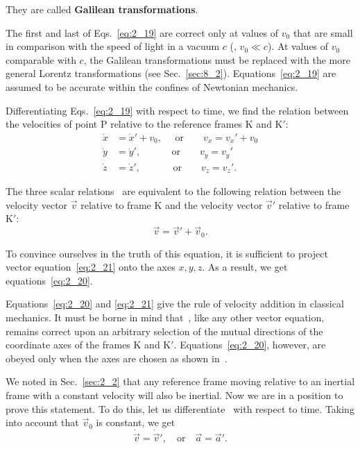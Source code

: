 \noindent
They are called \textbf{Galilean transformations}.

The first and last of Eqs.~\eqref{eq:2_19} are correct only at values of $v_0$ that are small in comparison with the speed of light in a vacuum $c$ (\ie, $v_0\ll c$). At values of $v_0$ comparable with $c$, the Galilean transformations must be replaced with the more general Lorentz transformations (see Sec.~\ref{sec:8_2}). Equations~\eqref{eq:2_19} are assumed to be accurate within the confines of Newtonian mechanics.

Differentiating Eqs.~\eqref{eq:2_19} with respect to time, we find the relation between the velocities of point P relative to the reference frames K and K$'$:
\begin{align}
\dot{x} &= \dot{x}'+v_0, \quad\,\,\text{or}\quad\quad v_x=v_x'+v_0\nonumber\\
\dot{y} &= \dot{y}', \quad\quad\,\,\,\,\,\,\,\text{or}\quad\quad v_y=v_y'\label{eq:2_20}\\
\dot{z} &= \dot{z}', \quad\quad\,\,\,\,\,\,\,\,\text{or}\quad\quad v_z=v_z'.\nonumber
\end{align}

The three scalar relations~ are equivalent to the following relation between the velocity vector $\vec{v}$ relative to frame K and the velocity vector $\vec{v}'$ relative to frame K$'$:
\begin{equation}\label{eq:2_21}
\vec{v} = \vec{v}' + \vec{v}_0.
\end{equation}

\noindent
To convince ourselves in the truth of this equation, it is sufficient to project vector equation~\eqref{eq:2_21} onto the axes $x, y, z$. As a result, we get equations~\eqref{eq:2_20}.

Equations~\eqref{eq:2_20} and \eqref{eq:2_21} give the rule of velocity addition in classical mechanics. It must be borne in mind that~, like any other vector equation, remains correct upon an arbitrary selection of the mutual directions of the coordinate axes of the frames K and K$'$. Equations~\eqref{eq:2_20}, however, are obeyed only when the axes are chosen as shown in~.

We noted in Sec.~\ref{sec:2_2} that any reference frame moving relative to an inertial frame with a constant velocity will also be inertial. Now we are in a position to prove this statement. To do this, let us differentiate~ with respect to time. Taking into account that $\vec{v}_0$ is constant, we get
\begin{equation}\label{eq:2_22}
\dot{\vec{v}} = \dot{\vec{v}}', \quad\text{or}\quad  \vec{a} = \vec{a}'.
\end{equation}

